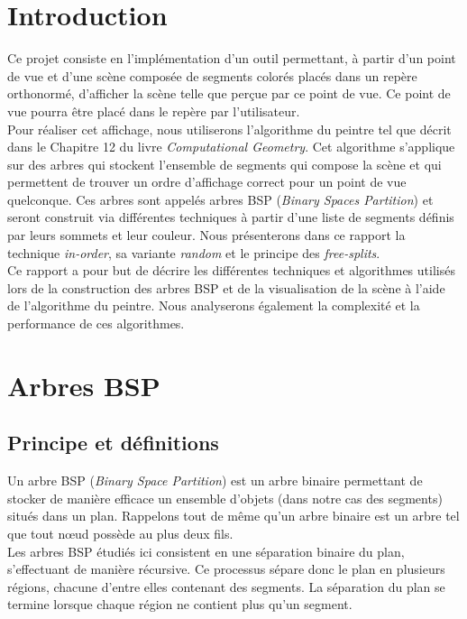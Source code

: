 \documentclass[11pt,a4paper]{article}
\theoremstyle{definition}
\theoremstyle{remark}
\begin{document}
\tableofcontents
\newpage

\section*{Introduction}
Ce projet consiste en l'implémentation d'un outil permettant, à partir d'un point de vue et d'une scène composée de segments colorés placés dans un repère orthonormé, d'afficher la scène telle que perçue par ce point de vue. Ce point de vue pourra être placé dans le repère par l'utilisateur.\\

Pour réaliser cet affichage, nous utiliserons l'algorithme du peintre tel que décrit dans le Chapitre 12 du livre \textit{Computational Geometry}. Cet algorithme s'applique sur des arbres qui stockent l'ensemble de segments qui compose la scène et qui permettent de trouver un ordre d'affichage correct pour un point de vue quelconque. Ces arbres sont appelés arbres BSP (\emph{Binary Spaces Partition}) et seront construit via différentes techniques à partir d'une liste de segments définis par leurs sommets et leur couleur. Nous présenterons dans ce rapport la technique \textit{in-order}, sa variante \textit{random} et le principe des \textit{free-splits}.\\

Ce rapport a pour but de décrire les différentes techniques et algorithmes utilisés lors de la construction des arbres BSP et de la visualisation de la scène à l'aide de l'algorithme du peintre. Nous analyserons également la complexité et la performance de ces algorithmes.

\newpage

\section{Arbres BSP}

\subsection{Principe et définitions}
Un arbre BSP (\emph{Binary Space Partition}) est un arbre binaire permettant de stocker de manière efficace un ensemble d'objets (dans notre cas des segments) situés dans un plan. Rappelons tout de même qu'un arbre binaire est un arbre tel que tout nœud possède au plus deux fils.\\

Les arbres BSP étudiés ici consistent en une séparation binaire du plan, s'effectuant de manière récursive. Ce processus sépare donc le plan en plusieurs régions, chacune d'entre elles contenant des segments. La séparation du plan se termine lorsque chaque région ne contient plus qu'un segment.\\
\end{document}
